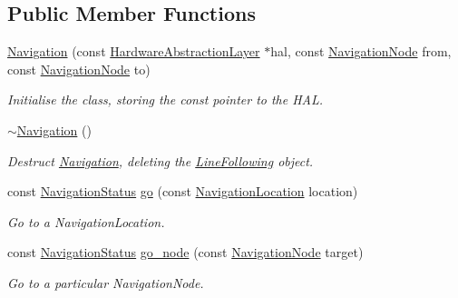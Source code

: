 \subsection*{Public Member Functions}
\begin{DoxyCompactItemize}
\item 
\hyperlink{classIDP_1_1Navigation_af32e7bdadf3997b12c71b95a7aede38c}{Navigation} (const \hyperlink{classIDP_1_1HardwareAbstractionLayer}{HardwareAbstractionLayer} $\ast$hal, const \hyperlink{namespaceIDP_a286f26dda01010063dff761803b4cd16}{NavigationNode} from, const \hyperlink{namespaceIDP_a286f26dda01010063dff761803b4cd16}{NavigationNode} to)
\begin{DoxyCompactList}\small\item\em Initialise the class, storing the const pointer to the HAL. \item\end{DoxyCompactList}\item 
\hyperlink{classIDP_1_1Navigation_a2af5390d05f2058beb841030f9aea0c0}{$\sim$Navigation} ()
\begin{DoxyCompactList}\small\item\em Destruct \hyperlink{classIDP_1_1Navigation}{Navigation}, deleting the \hyperlink{classIDP_1_1LineFollowing}{LineFollowing} object. \item\end{DoxyCompactList}\item 
const \hyperlink{namespaceIDP_a1a96e566e4d675fdf20780cc96d92283}{NavigationStatus} \hyperlink{classIDP_1_1Navigation_ab5cf30dd7a21c90d2ae58309ce0ddfa6}{go} (const \hyperlink{namespaceIDP_ab9c412f0fd539b5d70385066c30465a0}{NavigationLocation} location)
\begin{DoxyCompactList}\small\item\em Go to a NavigationLocation. \item\end{DoxyCompactList}\item 
const \hyperlink{namespaceIDP_a1a96e566e4d675fdf20780cc96d92283}{NavigationStatus} \hyperlink{classIDP_1_1Navigation_a2f773d387e37fd25c473cd2e130c1cf3}{go\_\-node} (const \hyperlink{namespaceIDP_a286f26dda01010063dff761803b4cd16}{NavigationNode} target)
\begin{DoxyCompactList}\small\item\em Go to a particular NavigationNode. \item\end{DoxyCompactList}\end{DoxyCompactItemize}


